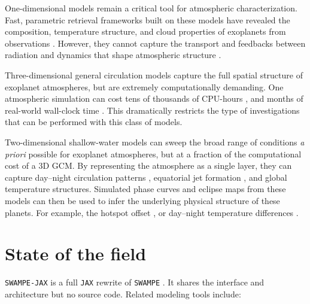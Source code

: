 \documentclass[10pt,a4paper,onecolumn]{article}
\begin{document}
One-dimensional models remain a critical tool for atmospheric characterization.
Fast, parametric retrieval frameworks built on these models have revealed the composition,
temperature structure, and cloud properties of exoplanets from observations
\citep[e.g.,][]{Madhusudhan:2009, Barstow:2017, Rustamkulov:2023}.
However, they cannot capture the transport and feedbacks between
radiation and dynamics that shape atmospheric structure \citep{Madhusudhan:2019}.

Three-dimensional general
circulation models \citep[e.g.,][]{Showman:2009, Kataria:2016, Carone:2020}
capture the full spatial structure of exoplanet atmospheres, but 
are extremely computationally demanding.
One atmospheric simulation can cost tens of thousands of CPU-hours
\citep[e.g.,][]{Roth:2024}, and months of real-world wall-clock time
\citep{Wang:2020}. This dramatically restricts the type of investigations that
can be performed with this class of models.

Two-dimensional shallow-water models can sweep the broad range of conditions
\textit{a priori} possible for exoplanet atmospheres, but at a fraction of the 
computational cost of a 3D GCM.
By representing the atmosphere as a single layer, they can capture 
day--night circulation patterns \citep[e.g.,][]{Perez-Becker:2013, Showman:2011},
equatorial jet formation \citep{Showman:2011}, and global temperature structures.
Simulated phase curves and eclipse maps from these models can then be used to
infer the underlying physical structure of these planets. For example, the
hotspot offset \citep{Penn:2017}, or day--night temperature differences
\citep{Perez-Becker:2013}.

\section{State of the field}

\texttt{SWAMPE-JAX} is a full \texttt{JAX} rewrite of \texttt{SWAMPE}
\citep{Landgren:2022}. It shares the interface and architecture but no
source code. Related modeling tools include:
\end{document}
